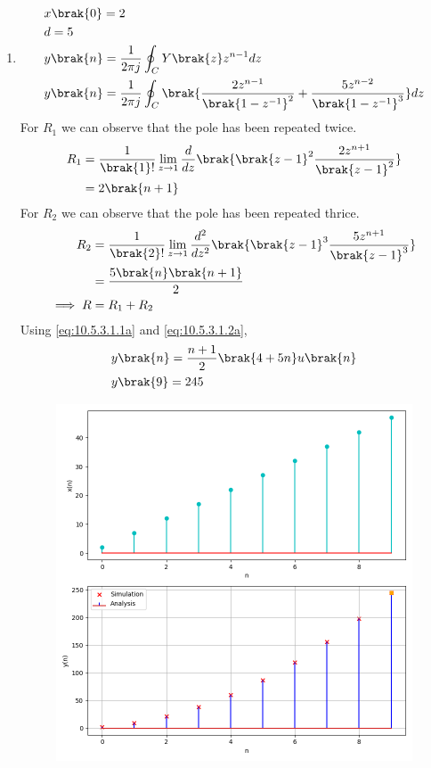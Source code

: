 \documentclass[journal,12pt,twocolumn]{IEEEtran}
\theoremstyle{remark}
\begin{document}
\begin{enumerate}[label=(\alph*)]
    \item \begin{align}
        &x\brak{0}=2 \\
        &d=5 \\
        &y\brak{n}=\frac{1}{2\pi j}\oint_{C}Y\brak{z}z^{n-1}dz  \\
        &y\brak{n}=\frac{1}{2\pi j}\oint_{C}\brak{\dfrac{2z^{n-1}}{\brak{1-z^{-1}}^2} + \dfrac{5z^{n-2}}{\brak{1-z^{-1}}^{3}}}dz \\
    \end{align}
    For $R_1$ we can observe that the pole has been repeated twice.
\begin{align}
    R_1&=\frac{1}{\brak {1}!}\lim\limits_{z\to 1}\frac{d}{dz}\brak {{\brak{z-1}}^{2}\frac{2z^{n+1}}{{\brak{z-1}}^2}}\\
    &=2\brak{n+1}\label{eq:10.5.3.1.1a}
\end{align}
    For $R_2$ we can observe that the pole has been repeated thrice.
\begin{align}
    R_2&=\frac{1}{\brak {2}!}\lim\limits_{z\to 1}\frac{d^{2}}{dz^{2}}\brak {{\brak{z-1}}^{3}\frac{5z^{n+1}}{{\brak{z-1}}^3}}\\
    &=\frac{5\brak{n}\brak{n+1}}{2}\label{eq:10.5.3.1.2a} \\
    \implies R&= R_1 + R_2
\end{align}
Using \eqref{eq:10.5.3.1.1a} and \eqref{eq:10.5.3.1.2a},
\begin{align}
    &y\brak{n}=\dfrac{n+1}{2}\brak{4+5n}u\brak{n} \\
    &y\brak{9}=245
\end{align}
    \begin{figure}[h!]
        \centering
        \includegraphics[width=\columnwidth]{ncert-maths/10/5/3/1/figs/plt1.png}

\end{figure}
\end{enumerate}
\end{document}
